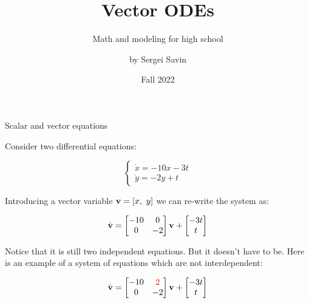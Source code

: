 \documentclass{beamer}
\title{Vector ODEs}
\subtitle{Math and modeling for high school}
\author{by Sergei Savin}
\date{Fall 2022}
\begin{document}
\maketitle


\begin{frame}{Scalar and vector equations}
	\begin{flushleft}
		
		Consider two differential equations:
		
		\begin{equation}
			\begin{cases}
				\dot x = -10x - 3t \\
				\dot y = -2y + t
			\end{cases}
		\end{equation}
	
		Introducing a vector variable $\mathbf{v} = [x, \ y]$ we can re-write the system as:
		
		\begin{equation}
		\dot{\mathbf{v}} = 
		\begin{bmatrix}
			-10 & 0 \\
			0 & -2
		\end{bmatrix}		
		\mathbf{v}
		+
		\begin{bmatrix}
			-3t \\
			t
		\end{bmatrix}
		\end{equation}		
		
		Notice that it is still two independent equations. But it doesn't have to be. Here is an example of a system of equations which are not interdependent:
		
		\begin{equation}
			\dot{\mathbf{v}} = 
			\begin{bmatrix}
				-10 & \textcolor{red}{2} \\
				0 &  -2
			\end{bmatrix}		
			\mathbf{v}
			+
			\begin{bmatrix}
				-3t \\
				t
			\end{bmatrix}
		\end{equation}		
		
	\end{flushleft}
\end{frame}
\end{document}

